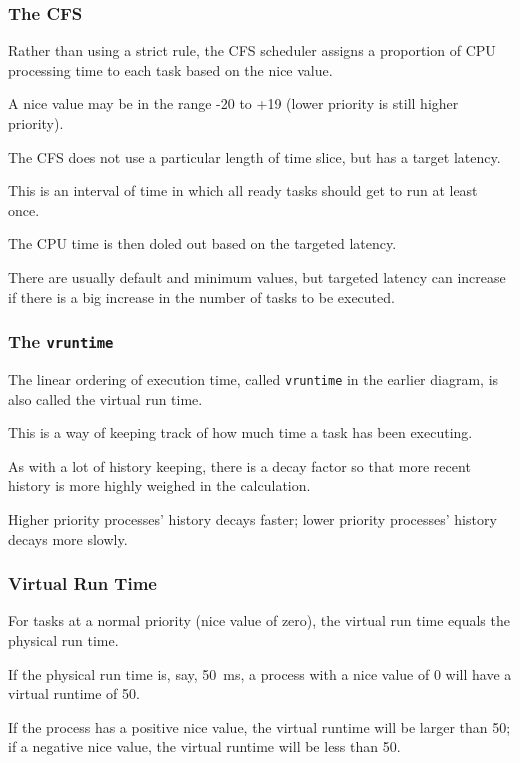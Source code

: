 \begin{frame}
\frametitle{The CFS}

Rather than using a strict rule, the CFS scheduler assigns a proportion of CPU processing time to each task based on the nice value. 

A nice value may be in the range -20 to +19 (lower priority is still higher priority).

The CFS does not use a particular length of time slice, but has a \alert{target latency}.

This is an interval of time in which all ready tasks should get to run at least once. 

The CPU time is then doled out based on the targeted latency. 

There are usually default and minimum values, but targeted latency can increase if there is a big increase in the number of tasks to be executed.

\end{frame}

\begin{frame}
\frametitle{The \texttt{vruntime}}

The linear ordering of execution time, called \texttt{vruntime} in the earlier diagram, is also called the \alert{virtual run time}.

 This is a way of keeping track of how much time a task has been executing. 
 
 As with a lot of history keeping, there is a decay factor so that more recent history is more highly weighed in the calculation. 
 
 Higher priority processes' history decays faster; lower priority processes' history decays more slowly. 
 

\end{frame}

\begin{frame}
\frametitle{Virtual Run Time}

For tasks at a normal priority (nice value of zero), the virtual run time equals the physical run time. 

If the physical run time is, say, 50~ms, a process with a nice value of 0 will have a virtual runtime of 50. 

If the process has a positive nice value, the virtual runtime will be larger than 50; if a negative nice value, the virtual runtime will be less than 50.

\end{frame}



